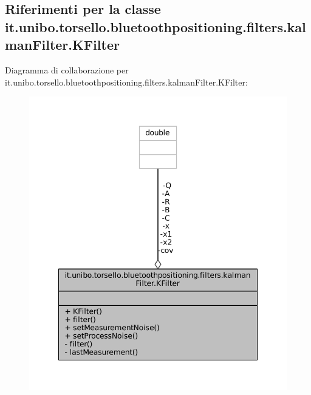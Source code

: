 \hypertarget{classit_1_1unibo_1_1torsello_1_1bluetoothpositioning_1_1filters_1_1kalmanFilter_1_1KFilter}{}\subsection{Riferimenti per la classe it.\+unibo.\+torsello.\+bluetoothpositioning.\+filters.\+kalman\+Filter.\+K\+Filter}
\label{classit_1_1unibo_1_1torsello_1_1bluetoothpositioning_1_1filters_1_1kalmanFilter_1_1KFilter}


Diagramma di collaborazione per it.\+unibo.\+torsello.\+bluetoothpositioning.\+filters.\+kalman\+Filter.\+K\+Filter\+:
\nopagebreak
\begin{figure}[H]
\begin{center}
\leavevmode
\includegraphics[width=348pt]{classit_1_1unibo_1_1torsello_1_1bluetoothpositioning_1_1filters_1_1kalmanFilter_1_1KFilter__coll__graph}
\end{center}
\end{figure}
